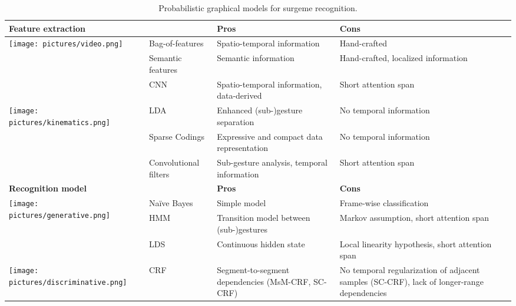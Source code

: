 \documentclass[journal]{IEEEtran}
\newcommand\T{\rule{0pt}{3.5ex}}
\newcommand\B{\rule[-3.5ex]{0pt}{0pt}}
\begin{document}
\begin{table*}[ht] 
    \caption{Probabilistic graphical models for surgeme recognition.} \label{tab:GMsummary}
    \begin{tabular}{m{1.5cm}m{3.5cm}m{5.5cm}m{5.5cm}} 
        \hline 
        \multicolumn{2}{l}{\textbf{Feature extraction}} & \textbf{Pros} & \textbf{Cons} \\
        \hline
        \multirow{3}{1em}{\T \texttt{[image: pictures/video.png]}}  &  \T Bag-of-features \cite{Tao2013} & \T Spatio-temporal information & \T Hand-crafted  \\
		& \T Semantic features \cite{Lea2015semantic, Lea2016convolutional} &  \T Semantic information & \T Hand-crafted, localized information  \\
		& \T CNN \cite{Lea2016, Rupprecht2016} \B & \T Spatio-temporal information, data-derived \B & \T Short attention span \B \\
		\hline
		\multirow{3}{1em}{\texttt{[image: pictures/kinematics.png]}} &  \T LDA \cite{Murphy2004, Lin2006, Reiley2008, Varadarajan2009} &  \T Enhanced (sub-)gesture separation & \T No temporal information  \\
		& \T Sparse Codings \cite{Tao2012, Sefati2015, Mavroudi2018} &  \T Expressive and compact data representation & \T No temporal information  \\
		& \T Convolutional filters \cite{Lea2016convolutional} \B &  \T Sub-gesture analysis, temporal information \B & \T Short attention span \B \\
		\hline
		\multicolumn{2}{l}{\textbf{Recognition model}} & \textbf{Pros} & \textbf{Cons} \\
        \hline
        \multirow{3}{1em}{\texttt{[image: pictures/generative.png]}} &  \T Na\"ive Bayes \cite{Lin2006} &  \T Simple model & \T Frame-wise classification  \\
		& \T HMM \cite{Murphy2004, Reiley2008, Varadarajan2009, Tao2012, Sefati2015, Selvaggio2018} &  \T Transition model between (sub-)gestures & \T Markov assumption, short attention span  \\
		& \T LDS \cite{Varadarajan2011, Varadarajan2011VAR} &  \T Continuous hidden state & \T Local linearity hypothesis, short attention span \B  \\
		\hline
		\hspace{1cm}
		\texttt{[image: pictures/discriminative.png]} & CRF \cite{Tao2013, Lea2015semantic, Mavroudi2018, Lea2016, Lea2016convolutional, Rupprecht2016} &  Segment-to-segment dependencies (MsM-CRF, SC-CRF) & No temporal regularization of adjacent samples (SC-CRF), lack of longer-range dependencies \\
		\hline
    \end{tabular}
\end{table*}
\end{document}
